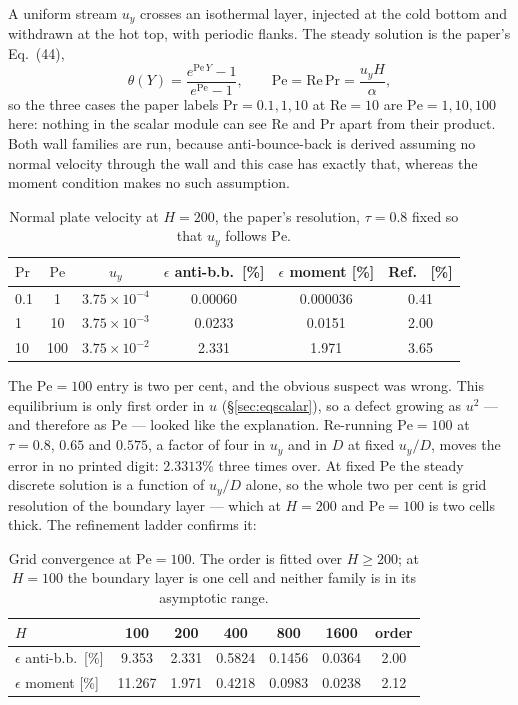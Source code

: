 \documentclass[11pt,a4paper]{article}
\begin{document}
A uniform stream $u_y$ crosses an isothermal layer, injected at the cold bottom
and withdrawn at the hot top, with periodic flanks. The steady solution is the
paper's Eq.~(44),
\begin{equation}
  \theta(Y) = \frac{e^{\mathrm{Pe}\,Y} - 1}{e^{\mathrm{Pe}} - 1},
  \qquad \mathrm{Pe} = \mathrm{Re}\,\mathrm{Pr} = \frac{u_y H}{\alpha},
\end{equation}
so the three cases the paper labels $\mathrm{Pr}=0.1,1,10$ at $\mathrm{Re}=10$
are $\mathrm{Pe}=1,10,100$ here: nothing in the scalar module can see
$\mathrm{Re}$ and $\mathrm{Pr}$ apart from their product. Both wall families are
run, because anti-bounce-back is derived assuming no normal velocity through the
wall and this case has exactly that, whereas the moment condition makes no such
assumption.

\begin{table}[h]
\centering\small
\begin{tabular}{lccccc}
\toprule
$\mathrm{Pr}$ & $\mathrm{Pe}$ & $u_y$ & $\epsilon$ anti-b.b.\ [\%] &
$\epsilon$ moment [\%] & Ref.~\cite{zhou2026} [\%] \\
\midrule
0.1 & 1   & $3.75\times10^{-4}$ & 0.00060 & 0.000036 & 0.41 \\
1   & 10  & $3.75\times10^{-3}$ & 0.0233  & 0.0151   & 2.00 \\
10  & 100 & $3.75\times10^{-2}$ & 2.331   & 1.971    & 3.65 \\
\bottomrule
\end{tabular}
\caption{Normal plate velocity at $H=200$, the paper's resolution,
$\tau=0.8$ fixed so that $u_y$ follows $\mathrm{Pe}$.\label{tab:zhouplate}}
\end{table}

\noindent The $\mathrm{Pe}=100$ entry is two per cent, and the obvious suspect
was wrong. This equilibrium is only first order in $u$
(\S\ref{sec:eqscalar}), so a defect growing as $u^2$ --- and therefore as
$\mathrm{Pe}$ --- looked like the explanation. Re-running $\mathrm{Pe}=100$ at
$\tau = 0.8$, $0.65$ and $0.575$, a factor of four in $u_y$ and in $D$ at fixed
$u_y/D$, moves the error in no printed digit: $2.3313\%$ three times over. At
fixed $\mathrm{Pe}$ the steady discrete solution is a function of $u_y/D$ alone,
so the whole two per cent is grid resolution of the boundary layer --- which at
$H=200$ and $\mathrm{Pe}=100$ is two cells thick. The refinement ladder confirms
it:

\begin{table}[h]
\centering\small
\begin{tabular}{lccccc|c}
\toprule
$H$ & 100 & 200 & 400 & 800 & 1600 & order \\
\midrule
$\epsilon$ anti-b.b.\ [\%] & 9.353 & 2.331 & 0.5824 & 0.1456 & 0.0364 & 2.00 \\
$\epsilon$ moment [\%]     & 11.267 & 1.971 & 0.4218 & 0.0983 & 0.0238 & 2.12 \\
\bottomrule
\end{tabular}
\caption{Grid convergence at $\mathrm{Pe}=100$. The order is fitted
over $H\ge200$; at $H=100$ the boundary layer is one cell and neither family is
in its asymptotic range.\label{tab:zhouplateconv}}
\end{table}
\end{document}
